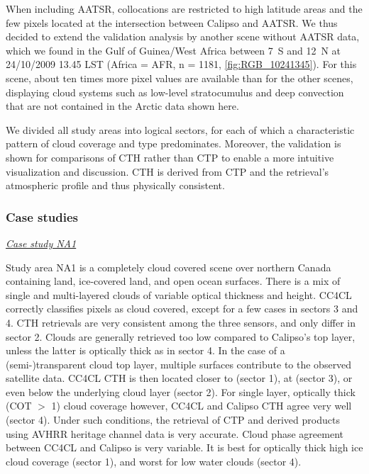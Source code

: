When including AATSR, collocations are restricted to high latitude areas and the few pixels located at the intersection between Calipso and AATSR. We thus decided to extend the validation analysis by another scene without AATSR data, which we found in the Gulf of Guinea/West Africa between 7\textdegree\ S and 12\textdegree\ N at 24/10/2009 13.45 LST (Africa = AFR, n = 1181, \cref{fig:RGB_10241345}). For this scene, about ten times more pixel values are available than for the other scenes, displaying cloud systems such as low-level stratocumulus and deep convection that are not contained in the Arctic data shown here. 

We divided all study areas into logical sectors, for each of which a characteristic pattern of cloud coverage and type predominates. Moreover, the validation is shown for comparisons of CTH rather than CTP to enable a more intuitive visualization and discussion. CTH is derived from CTP and the retrieval's atmospheric profile and thus physically consistent. 

\subsubsection{Case studies}

\vspace{5mm}\underline{\textit{Case study NA1}}\vspace{2mm}

Study area NA1 is a completely cloud covered scene over northern Canada containing land, ice-covered land, and open ocean surfaces. There is a mix of single and multi-layered clouds of variable optical thickness and height. CC4CL correctly classifies pixels as cloud covered, except for a few cases in sectors 3 and 4. CTH retrievals are very consistent among the three sensors, and only differ in sector 2. Clouds are generally retrieved too low compared to Calipso's top layer, unless the latter is optically thick as in sector 4. In the case of a (semi-)transparent cloud top layer, multiple surfaces contribute to the observed satellite data. CC4CL CTH is then located closer to (sector 1), at (sector 3), or even below the underlying cloud layer (sector 2). For single layer, optically thick (COT $>$ 1) cloud coverage however, CC4CL and Calipso CTH agree very well (sector 4). Under such conditions, the retrieval of CTP and derived products using AVHRR heritage channel data is very accurate. Cloud phase agreement between CC4CL and Calipso is very variable. It is best for optically thick high ice cloud coverage (sector 1), and worst for low water clouds (sector 4).

